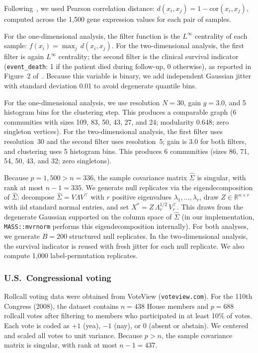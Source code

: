 \documentclass[hidelinks]{siamart251216}
\newcommand{\R}{\mathbb{R}}
\begin{document}
Following~\cite{Lum2013}, we used Pearson correlation distance:
$d(x_i, x_j) = 1 - \mathrm{cor}(x_i, x_j)$, computed across the 1,500
gene expression values for each pair of samples.

For the one-dimensional analysis, the filter function is the $L^\infty$
centrality of each sample: $f(x_i) = \max_j\, d(x_i, x_j)$.  For the
two-dimensional analysis, the first filter is again $L^\infty$
centrality; the second filter is the clinical survival indicator
(\texttt{event\_death}: 1 if the patient died during follow-up, 0
otherwise), as reported in Figure~2 of~\cite{Lum2013}.  Because this
variable is binary, we add independent Gaussian jitter with standard
deviation 0.01 to avoid degenerate quantile bins.

For the one-dimensional analysis, we use resolution $N = 30$, gain
$g = 3.0$, and 5 histogram bins for the clustering step.  This produces
a comparable graph (6 communities with sizes 109, 83, 50, 43, 27,
and 24; modularity 0.648; zero singleton vertices).  For the
two-dimensional analysis, the first filter uses resolution~30 and the
second filter uses resolution~5; gain is 3.0 for both filters, and
clustering uses 5 histogram bins.  This produces 6 communities (sizes 86,
71, 54, 50, 43, and 32; zero singletons).

Because $p = 1{,}500 > n = 336$, the sample covariance matrix
$\hat{\Sigma}$ is singular, with rank at most $n - 1 = 335$.  We
generate null replicates via the eigendecomposition of
$\hat{\Sigma}$: decompose $\hat{\Sigma} = V \Lambda V^\top$ with
$r$ positive eigenvalues $\lambda_1, \ldots, \lambda_r$, draw
$Z \in \R^{n \times r}$ with iid standard normal entries, and set
$X^* = Z\, \Lambda_r^{1/2}\, V_r^\top$.  This draws from the
degenerate Gaussian supported on the column space of $\hat{\Sigma}$
(in our implementation, \texttt{MASS::mvrnorm} performs this
eigendecomposition internally).  For both analyses, we generate
$B = 200$ structured null replicates.  In the two-dimensional
analysis, the survival indicator is reused with fresh jitter for each
null replicate.  We also compute 1,000 label-permutation replicates.

\subsubsection*{U.S.\ Congressional voting}

Rollcall voting data were obtained from VoteView
(\texttt{voteview.com}).  For the 110th Congress (2008), the dataset
contains $n = 438$ House members and $p = 688$ rollcall votes after
filtering to members who participated in at least 10\% of votes.  Each
vote is coded as $+1$ (yea), $-1$ (nay), or $0$ (absent or abstain).
We centered and scaled all votes to unit variance.
Because $p > n$, the sample covariance matrix is singular, with rank at
most $n - 1 = 437$.
\end{document}
